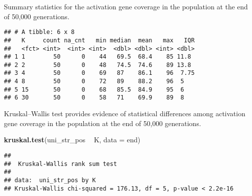 \documentclass[]{book}
\newenvironment{Shaded}{\begin{snugshade}}{\end{snugshade}}
\newcommand{\DataTypeTok}[1]{\textcolor[rgb]{0.13,0.29,0.53}{#1}}
\newcommand{\KeywordTok}[1]{\textcolor[rgb]{0.13,0.29,0.53}{\textbf{#1}}}
\newcommand{\NormalTok}[1]{#1}
\newcommand{\OperatorTok}[1]{\textcolor[rgb]{0.81,0.36,0.00}{\textbf{#1}}}
\newcommand{\OtherTok}[1]{\textcolor[rgb]{0.56,0.35,0.01}{#1}}
\newcommand{\StringTok}[1]{\textcolor[rgb]{0.31,0.60,0.02}{#1}}
\begin{document}
Summary statistics for the activation gene coverage in the population at the end of 50,000 generations.

\begin{Shaded}
\end{Shaded}

\begin{verbatim}
## # A tibble: 6 x 8
##   K     count na_cnt   min median  mean   max   IQR
##   <fct> <int>  <int> <int>  <dbl> <dbl> <int> <dbl>
## 1 1        50      0    44   69.5  68.4    85 11.8 
## 2 2        50      0    48   74.5  74.6    89 13.8 
## 3 4        50      0    69   87    86.1    96  7.75
## 4 8        50      0    72   89    88.2    96  5   
## 5 15       50      0    68   85.5  84.9    95  6   
## 6 30       50      0    58   71    69.9    89  8
\end{verbatim}

Kruskal--Wallis test provides evidence of statistical differences among activation gene coverage in the population at the end of 50,000 generations.

\begin{Shaded}
\begin{Highlighting}[]
\KeywordTok{kruskal.test}\NormalTok{(uni_str_pos }\OperatorTok{~}\StringTok{ }\NormalTok{K, }\DataTypeTok{data =}\NormalTok{ end)}
\end{Highlighting}
\end{Shaded}

\begin{verbatim}
## 
##  Kruskal-Wallis rank sum test
## 
## data:  uni_str_pos by K
## Kruskal-Wallis chi-squared = 176.13, df = 5, p-value < 2.2e-16
\end{verbatim}
\end{document}

